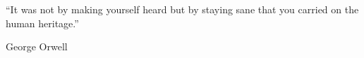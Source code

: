 



 \cleardoublepage

\chapter*{}

\renewcommand{\epigraphsize}{\footnotesize}
\epigraph{``It was not by making yourself heard but by staying sane that you carried on the human heritage.''}{George Orwell}

\cleardoublepage


 \setcounter{tocdepth}{2}
 \tableofcontents

 \cleardoublepage




 \cleardoublepage





